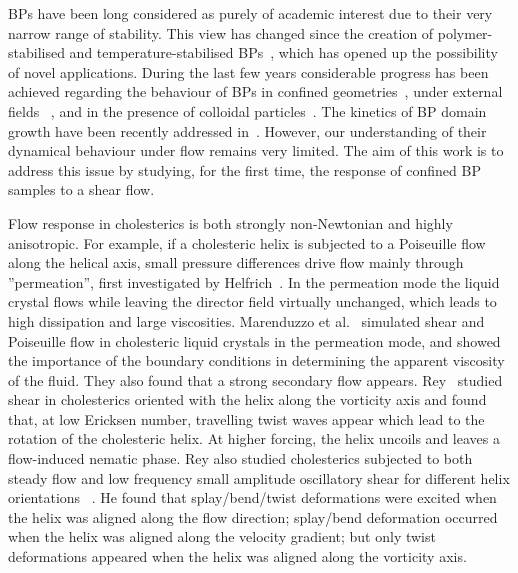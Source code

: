 \documentclass[aps,pre,reprint,superscriptaddress, twocolumn]{revtex4}
\begin{document}
BPs have been long considered as purely of academic interest due to their very narrow 
range of stability. This view has changed since the creation of polymer-stabilised and 
temperature-stabilised BPs~\cite{Kikuchi:2002,Coles:2005}, which has opened up the 
possibility of novel applications.
During the last few years considerable progress has been achieved regarding the behaviour 
of BPs in confined geometries~\cite{Fukuda:2010a, Fukuda:2010b, Ravnik:2011b}, under 
external fields ~\cite{Alexander:2008,Fukuda:2009,Henrich:2010a,Castles:2010,Tiribocchi:2011a}, 
and in the presence of colloidal particles~\cite{Ravnik:2011a}.
The kinetics of BP domain growth have been recently addressed in~\cite{Henrich:2010b}. 
However, our understanding of their dynamical behaviour under flow remains
very limited. The aim of this work is to address this issue by studying,
for the first time, the response of confined BP samples to a shear flow.

Flow response in cholesterics is both strongly non-Newtonian and highly anisotropic.
For example, if a cholesteric helix is subjected to a Poiseuille flow along
the helical axis, small pressure differences drive flow mainly through
''permeation'', first investigated by Helfrich~\cite{Helfrich:1969}.
In the permeation mode the liquid crystal flows while leaving the director
field virtually unchanged, which leads to high dissipation and large
viscosities. Marenduzzo et al.~\cite{Marenduzzo:2006a,Marenduzzo:2006b} simulated 
shear and Poiseuille flow in cholesteric liquid crystals in the permeation mode, and 
showed the importance of the boundary conditions in determining the apparent viscosity of the fluid. 
They also found that a strong secondary flow appears.
Rey~\cite{Rey:1996a, Rey:1996b} studied shear in cholesterics oriented with the helix along 
the vorticity axis and found that, at low Ericksen number, travelling twist waves appear which 
lead to the rotation of the cholesteric helix. At higher forcing, the helix uncoils and 
leaves a flow-induced nematic phase.
Rey also studied cholesterics subjected to both steady flow and low frequency
small amplitude oscillatory shear for different helix orientations
~\cite{Rey:2000, Rey:2002}. He found that splay/bend/twist deformations were
excited when the helix was aligned along the flow direction; splay/bend
deformation occurred when the helix was aligned along the velocity gradient;
but only twist deformations
appeared when the helix was aligned along the vorticity axis.
\end{document}

